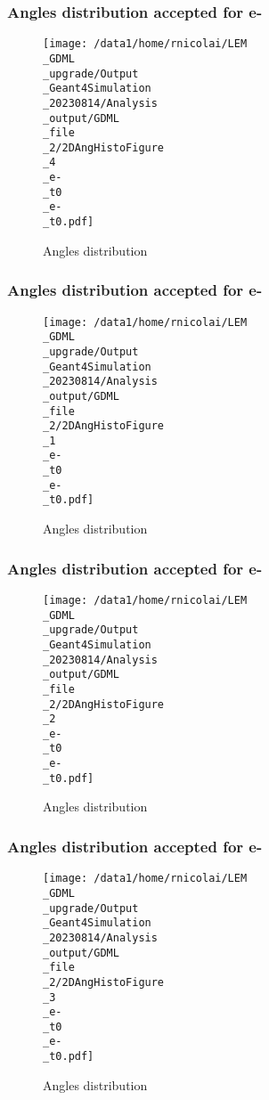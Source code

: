 \documentclass[8pt]{beamer}
\begin{document}
            \begin{frame}
                \frametitle{Angles distribution accepted for e-}
            
        \begin{figure}[h]
            \centering
            \texttt{[image: /data1/home/rnicolai/LEM\\\_GDML\\\_upgrade/Output\\\_Geant4Simulation\\\_20230814/Analysis\\\_output/GDML\\\_file\\\_2/2DAngHistoFigure\\\_4\\\_e-\\\_t0\\\_e-\\\_t0.pdf]}
            \caption{Angles distribution}
        \end{figure}
        
            \end{frame}
            
            \begin{frame}
                \frametitle{Angles distribution accepted for e-}
            
        \begin{figure}[h]
            \centering
            \texttt{[image: /data1/home/rnicolai/LEM\\\_GDML\\\_upgrade/Output\\\_Geant4Simulation\\\_20230814/Analysis\\\_output/GDML\\\_file\\\_2/2DAngHistoFigure\\\_1\\\_e-\\\_t0\\\_e-\\\_t0.pdf]}
            \caption{Angles distribution}
        \end{figure}
        
            \end{frame}
            
            \begin{frame}
                \frametitle{Angles distribution accepted for e-}
            
        \begin{figure}[h]
            \centering
            \texttt{[image: /data1/home/rnicolai/LEM\\\_GDML\\\_upgrade/Output\\\_Geant4Simulation\\\_20230814/Analysis\\\_output/GDML\\\_file\\\_2/2DAngHistoFigure\\\_2\\\_e-\\\_t0\\\_e-\\\_t0.pdf]}
            \caption{Angles distribution}
        \end{figure}
        
            \end{frame}
            
            \begin{frame}
                \frametitle{Angles distribution accepted for e-}
            
        \begin{figure}[h]
            \centering
            \texttt{[image: /data1/home/rnicolai/LEM\\\_GDML\\\_upgrade/Output\\\_Geant4Simulation\\\_20230814/Analysis\\\_output/GDML\\\_file\\\_2/2DAngHistoFigure\\\_3\\\_e-\\\_t0\\\_e-\\\_t0.pdf]}
            \caption{Angles distribution}
        \end{figure}
        
            \end{frame}
            
\end{document}
